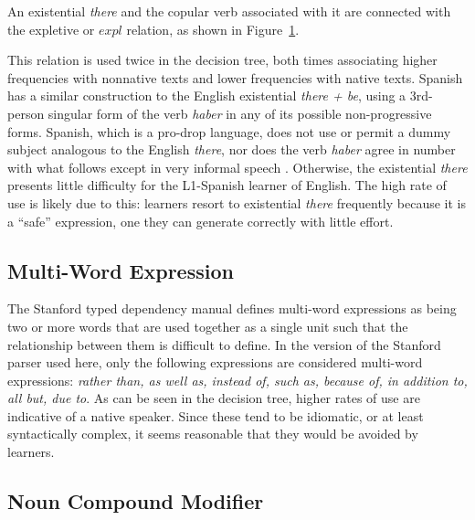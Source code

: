 \documentclass[main.tex]{subfiles}
\begin{document}
An existential \textit{there} and the copular verb associated with it are connected with the expletive or $expl$ relation, as shown in Figure~\ref{ex:expl}. 
\begin{figure}[ht]
\centering
{}
\label{ex:expl}
\end{figure}
This relation is used twice in the decision tree, both times associating higher frequencies with nonnative texts and lower frequencies with native texts. Spanish has a similar construction to the English existential \textit{there + be}, using a 3rd-person singular form of the verb \textit{haber} in any of its possible non-progressive forms. Spanish, which is a pro-drop language, does not use or permit a dummy subject analogous to the English \textit{there}, nor does the verb \textit{haber} agree in number with what follows except in very informal speech \citep[pp. 429-32]{butt}. Otherwise, the existential \textit{there} presents little difficulty for the L1-Spanish learner of English. The high rate of use is likely due to this: learners resort to existential \textit{there} frequently because it is a ``safe'' expression, one they can generate correctly with little effort.

\subsection{Multi-Word Expression}

The Stanford typed dependency manual \citep{typed-deps-manual} defines multi-word expressions as being two or more words that are used together as a single unit such that the relationship between them is difficult to define. In the version of the Stanford parser used here, only the following expressions are considered multi-word expressions: \textit{rather than, as well as, instead of, such as, because of, in addition to, all but, due to}. As can be seen in the decision tree, higher rates of use are indicative of a native speaker. Since these tend to be idiomatic, or at least syntactically complex, it seems reasonable that they would be avoided by learners.

\subsection{Noun Compound Modifier}
\label{sub:nn}
\end{document}
